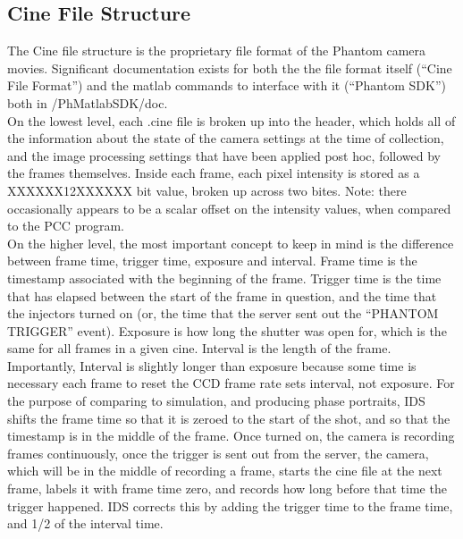 \documentclass[twoside]{article}
\begin{document}
\subsection{Cine File Structure}
\hspace{4ex}The Cine file structure is the proprietary file format of the Phantom camera movies. Significant documentation exists for both the the file format itself (“Cine File Format”) and the matlab commands to interface with it (“Phantom SDK”) both in /PhMatlabSDK/doc. \\
\hspace*{4ex}On the lowest level, each .cine file is broken up into the header, which holds all of the information about the state of the camera settings at the time of collection, and the image processing settings that have been applied post hoc, followed by the frames themselves. Inside each frame, each pixel intensity is stored as a XXXXXX12XXXXXX bit value, broken up across two bites. Note: there occasionally appears to be a scalar offset on the intensity values, when compared to the PCC program. \\
\hspace*{4ex}On the higher level, the most important concept to keep in mind is the difference between frame time, trigger time, exposure and interval. Frame time is the timestamp associated with the beginning of the frame. Trigger time is the time that has elapsed between the start of the frame in question, and the time that the injectors turned on (or, the time that the server sent out the “PHANTOM TRIGGER” event). Exposure is how long the shutter was open for, which is the same for all frames in a given cine. Interval is the length of the frame. Importantly, Interval is slightly longer than exposure because some time is necessary each frame to reset the CCD frame rate sets interval, not exposure. For the purpose of comparing to simulation, and producing phase portraits, IDS shifts the frame time so that it is zeroed to the start of the shot, and so that the timestamp is in the middle of the frame. Once turned on, the camera is recording frames continuously, once the trigger is sent out from the server, the camera, which will be in the middle of recording a frame, starts the cine file at the next frame, labels it with frame time zero, and records how long before that time the trigger happened. IDS corrects this by adding the trigger time to the frame time, and 1/2 of the interval time. \\
\end{document}
